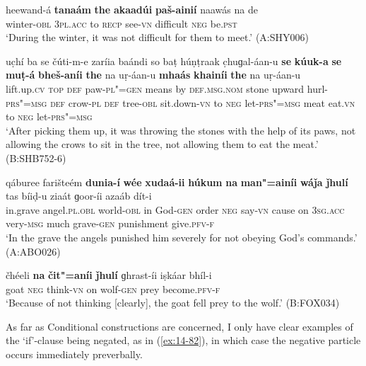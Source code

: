 \begin{exe}
\ex
\label{ex:14-78}
\gll heewand-á \textbf{tanaám} \textbf{the} \textbf{akaadúi} \textbf{paš-ainií} naawás  na de \\
winter-\textsc{obl} \textsc{3pl.acc} to \textsc{recp} see-\textsc{vn} difficult \textsc{neg}
be.\textsc{pst} \\
\glt `During the winter, it was not difficult for them to meet.' (A:SHY006)

\ex
\label{ex:14-79}
\gll uc̣hí ba se čúti-m-e zaríia baándi  so baṭ húṇṭraak c̣huɡal-áan-u  \textbf{se} \textbf{kúuk-a} \textbf{se} \textbf{muṭ-á} \textbf{bheš-aníi} \textbf{the} na uṛ-áan-u \textbf{mhaás} \textbf{khainíi} \textbf{the} na uṛ-áan-u\\
lift.up.\textsc{cv} \textsc{top} \textsc{def} paw-\textsc{pl"=gen} means by  \textsc{def.msg.nom} stone upward hurl-\textsc{prs"=msg}  \textsc{def} crow-\textsc{pl} \textsc{def} tree-\textsc{obl} sit.down-\textsc{vn} to \textsc{neg} let-\textsc{prs"=msg} meat eat.\textsc{vn} to \textsc{neg} let-\textsc{prs"=msg} \\
\glt `After picking them up, it was throwing the stones with the help of its paws, not allowing the crows to sit in the tree, not allowing them to eat the meat.' (B:SHB752-6)

\ex
\label{ex:14-80}
\gll qáburee farišteém \textbf{dunia-í} \textbf{wée} \textbf{xudaá-ii} \textbf{húkum} \textbf{na} \textbf{man"=ainíi} \textbf{wáǰa} \textbf{ǰhulí} tas bíiḍ-u ziaát  ɡoor-íi azaáb dít-i\\
in.grave angel.\textsc{pl.obl} world-\textsc{obl} in God-\textsc{gen} order \textsc{neg} say-\textsc{vn} cause on \textsc{3sg.acc} very-\textsc{msg} much grave-\textsc{gen} punishment give.\textsc{pfv-f}\\
\glt `In the grave the angels punished him severely for not obeying God's commands.' (A:ABO026)

\ex
\label{ex:14-81}
\gll čhéeli \textbf{na} \textbf{čit"=aníi} \textbf{ǰhulí} ɡhrast-íi iṣkáar bhíl-i \\
goat \textsc{neg} think-\textsc{vn} on wolf-\textsc{gen} prey become.\textsc{pfv-f} \\
\glt `Because of not thinking [clearly], the goat fell prey to the wolf.' (B:FOX034)
\end{exe}

As far as Conditional constructions are concerned, I only have clear examples of the `if'-clause being negated, as in (\ref{ex:14-82}), in which case the negative particle occurs immediately preverbally.

